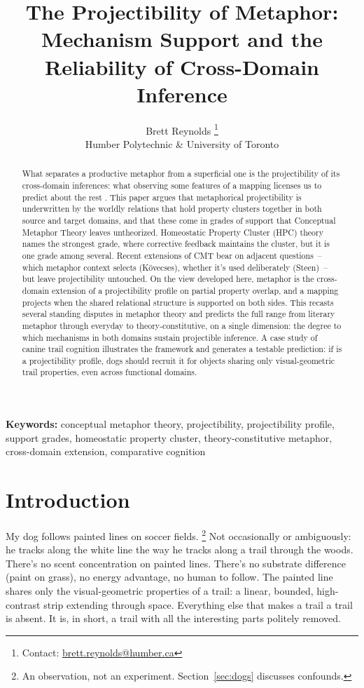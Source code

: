 \documentclass[12pt]{article}
\title{The Projectibility of Metaphor:\\Mechanism Support and the Reliability of Cross-Domain Inference}
\author{Brett Reynolds \orcidlink{0000-0003-0073-7195}%
\thanks{Contact: \href{mailto:brett.reynolds@humber.ca}{brett.reynolds@humber.ca}}\\
Humber Polytechnic \& University of Toronto}
\date{}
\begin{document}
\maketitle

\begin{abstract}
What separates a productive metaphor from a superficial one is the projectibility of its cross-domain inferences: what observing some features of a mapping licenses us to predict about the rest \citep{Goodman1955}. This paper argues that metaphorical projectibility is underwritten by the worldly relations that hold property clusters together in both source and target domains, and that these come in grades of support that  Conceptual Metaphor Theory leaves untheorized.  Homeostatic Property Cluster (HPC) theory names the strongest grade, where corrective feedback maintains the cluster, but it is one grade among several. Recent extensions of CMT bear on adjacent questions~-- which metaphor context selects (Kövecses), whether it's used deliberately (Steen)~-- but leave projectibility untouched. On the view developed here, metaphor is the cross-domain extension of a projectibility profile on partial property overlap, and a mapping projects when the shared relational structure is supported on both sides. This recasts several standing disputes in metaphor theory and predicts the full range from literary metaphor through everyday to theory-constitutive, on a single dimension: the degree to which mechanisms in both domains sustain projectible inference. A case study of canine trail cognition illustrates the framework and generates a testable prediction: if  is a projectibility profile, dogs should recruit it for objects sharing only visual-geometric trail properties, even across functional domains.
\end{abstract}

\noindent\textbf{Keywords:} conceptual metaphor theory, projectibility, projectibility profile, support grades, homeostatic property cluster, theory-constitutive metaphor, cross-domain extension, comparative cognition

\section{Introduction}
\label{sec:intro}

My dog follows painted lines on soccer fields.%
\footnote{An observation, not an experiment. Section~\ref{sec:dogs} discusses confounds.} Not occasionally or ambiguously: he tracks along the white line the way he tracks along a trail through the woods. There's no scent concentration on painted lines. There's no substrate difference (paint on grass), no energy advantage, no human to follow. The painted line shares only the visual-geometric properties of a trail: a linear, bounded, high-contrast strip extending through space. Everything else that makes a trail a trail is absent. It is, in short, a trail with all the interesting parts politely removed.
\end{document}
